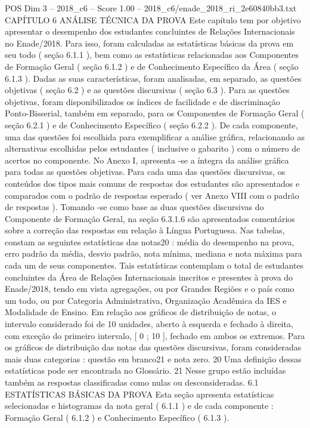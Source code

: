 \begin{textsample}{POS Dim 3 – 2018\_c6 – Score 1.00 – 2018\_c6/enade\_2018\_ri\_2e60840bb3.txt}  \label{ex:f3_pos_116}
CAPÍTULO 6 ANÁLISE TÉCNICA DA PROVA Este capítulo tem por objetivo apresentar o desempenho dos estudantes concluintes de Relações Internacionais no Enade/2018.
Para isso, foram calculadas as estatísticas básicas da prova em seu todo ( seção 6.1.1 ), bem como as estatísticas relacionadas aos Componentes de Formação Geral ( seção 6.1.2 ) e de Conhecimento Específico da Área ( seção 6.1.3 ).
Dadas as suas características, foram analisadas, em separado, as questões objetivas ( seção 6.2 ) e as questões discursivas ( seção 6.3 ).
Para as questões objetivas, foram disponibilizados os índices de facilidade e de discriminação Ponto-Bisserial, também em separado, para os Componentes de Formação Geral ( seção 6.2.1 ) e de Conhecimento Específico ( seção 6.2.2 ).
De cada componente, uma das questões foi escolhida para exemplificar a análise gráfica, relacionando as alternativas escolhidas pelos estudantes ( inclusive o gabarito ) com o número de acertos no componente.
No Anexo I, apresenta -se a íntegra da análise gráfica para todas as questões objetivas.
Para cada uma das questões discursivas, os conteúdos dos tipos mais comuns de respostas dos estudantes são apresentados e comparados com o padrão de respostas esperado ( ver Anexo VIII com o padrão de respostas ).
Tomando -se como base as duas questões discursivas do Componente de Formação Geral, na seção 6.3.1.6 são apresentados comentários sobre a correção das respostas em relação à Língua Portuguesa.
Nas tabelas, constam as seguintes estatísticas das notas20 : média do desempenho na prova, erro padrão da média, desvio padrão, nota mínima, mediana e nota máxima para cada um de seus componentes.
Tais estatísticas contemplam o total de estudantes concluintes da Área de Relações Internacionais inscritos e presentes à prova do Enade/2018, tendo em vista agregações, ou por Grandes Regiões e o país como um todo, ou por Categoria Administrativa, Organização Acadêmica da IES e Modalidade de Ensino.
Em relação aos gráficos de distribuição de notas, o intervalo considerado foi de 10 unidades, aberto à esquerda e fechado à direita, com exceção do primeiro intervalo, [ 0 ; 10 ], fechado em ambos os extremos.
Para os gráficos de distribuição das notas das questões discursivas, foram consideradas mais duas categorias : questão em branco21 e nota zero. 20 Uma definição dessas estatísticas pode ser encontrada no Glossário. 21 Nesse grupo estão incluídas também as respostas classificadas como nulas ou desconsideradas. 6.1 ESTATÍSTICAS BÁSICAS DA PROVA Esta seção apresenta estatísticas selecionadas e histogramas da nota geral ( 6.1.1 ) e de cada componente : Formação Geral ( 6.1.2 ) e Conhecimento Específico ( 6.1.3 ).

\end{textsample}
